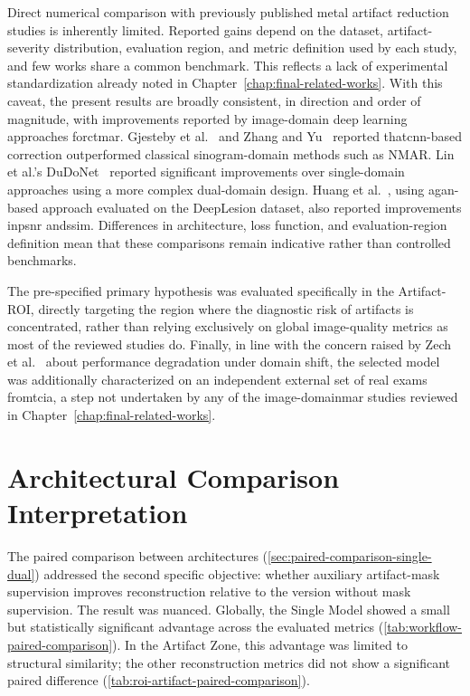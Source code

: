 Direct numerical comparison with previously published metal artifact reduction studies is inherently limited. Reported gains depend on the dataset, artifact-severity distribution, evaluation region, and metric definition used by each study, and few works share a common benchmark. This reflects a lack of experimental standardization already noted in Chapter~\ref{chap:final-related-works}. With this caveat, the present results are broadly consistent, in direction and order of magnitude, with improvements reported by image-domain deep learning approaches for\acrshort{ctmar}. Gjesteby et al.~\cite{gjestebyDeepLearningMethods2017} and Zhang and Yu~\cite{zhangConvolutionalNeuralNetwork2018} reported that\acrshort{cnn}-based correction outperformed classical sinogram-domain methods such as NMAR. Lin et al.'s DuDoNet~\cite{linDuDoNetDualDomain2019} reported significant improvements over single-domain approaches using a more complex dual-domain design. Huang et al.~\cite{huangMultimodalFeaturefusionCT2022}, using a\acrshort{gan}-based approach evaluated on the DeepLesion dataset, also reported improvements in\acrshort{psnr} and\acrshort{ssim}. Differences in architecture, loss function, and evaluation-region definition mean that these comparisons remain indicative rather than controlled benchmarks.

The pre-specified primary hypothesis was evaluated specifically in the Artifact-ROI, directly targeting the region where the diagnostic risk of artifacts is concentrated, rather than relying exclusively on global image-quality metrics as most of the reviewed studies do. Finally, in line with the concern raised by Zech et al.~\cite{zechVariableGeneralizationPerformance2018} about performance degradation under domain shift, the selected model was additionally characterized on an independent external set of real exams from\acrshort{tcia}, a step not undertaken by any of the image-domain\acrshort{mar} studies reviewed in Chapter~\ref{chap:final-related-works}.

\section{Architectural Comparison Interpretation}

The paired comparison between architectures (\autoref{sec:paired-comparison-single-dual}) addressed the second specific objective: whether auxiliary artifact-mask supervision improves reconstruction relative to the version without mask supervision. The result was nuanced. Globally, the Single Model showed a small but statistically significant advantage across the evaluated metrics (\autoref{tab:workflow-paired-comparison}). In the Artifact Zone, this advantage was limited to structural similarity; the other reconstruction metrics did not show a significant paired difference (\autoref{tab:roi-artifact-paired-comparison}).

